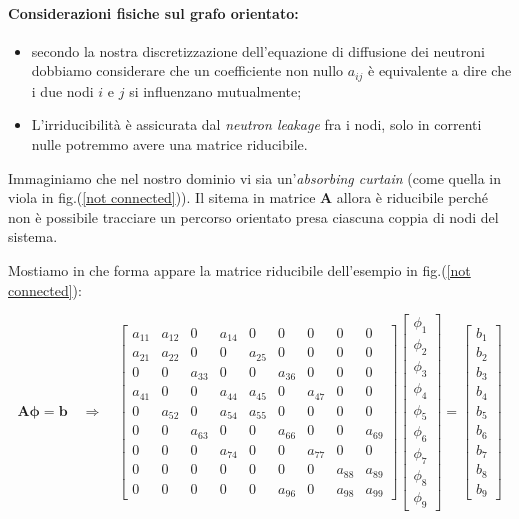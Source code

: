 \paragraph{Considerazioni fisiche sul grafo orientato: }

\begin{itemize}
	\item secondo la nostra discretizzazione dell'equazione di diffusione dei neutroni dobbiamo considerare che un coefficiente non nullo $a_{ij}$ è equivalente a dire che i due nodi $i$ e $j$ si influenzano mutualmente;
	\item L'irriducibilità è assicurata dal \emph{neutron leakage} fra i nodi, solo in correnti nulle potremmo avere una matrice riducibile.
\end{itemize}

Immaginiamo che nel nostro dominio vi sia un'\emph{absorbing curtain} (come quella in viola in fig.(\ref{not connected})). Il sitema in matrice $\mathbf A$ allora è riducibile perché non è possibile tracciare un percorso orientato presa ciascuna coppia di nodi del sistema.

Mostiamo in che forma appare la matrice riducibile dell'esempio in fig.(\ref{not connected}):

\[ \mathbf{A} \mathbf{\phi} = \mathbf{b}
\quad \Rightarrow \quad
\begin{bmatrix}
	a_{11} & a_{12} & 0 & a_{14} & 0 & 0 & 0 & 0 & 0 \\
	a_{21} & a_{22} & 0 & 0 & a_{25} & 0 & 0 & 0 & 0 \\
	0 & 0 & a_{33} & 0 & 0 & a_{36} & 0 & 0 & 0 \\
	a_{41} & 0 & 0 & a_{44} & a_{45} & 0 & a_{47} & 0 & 0 \\
	0 & a_{52} & 0 & a_{54} & a_{55} & 0 & 0 & 0 & 0 \\
	0 & 0 & a_{63} & 0 & 0 & a_{66} & 0 & 0 & a_{69} \\
	0 & 0 & 0 & a_{74} & 0 & 0 & a_{77} & 0 & 0 \\
	0 & 0 & 0 & 0 & 0 & 0 & 0 & a_{88} & a_{89} \\
	0 & 0 & 0 & 0 & 0 & a_{96} & 0 & a_{98} & a_{99}
\end{bmatrix}
\begin{bmatrix}
	\phi_1 \\ \phi_2 \\ \phi_3 \\ \phi_4 \\ \phi_5 \\ \phi_6 \\ \phi_7 \\ \phi_8 \\ \phi_9
\end{bmatrix}
=
\begin{bmatrix}
	b_1 \\ b_2 \\ b_3 \\ b_4 \\ b_5 \\ b_6 \\ b_7 \\ b_8 \\ b_9
\end{bmatrix} \]

